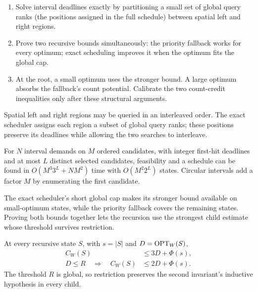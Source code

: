 \begin{proofstrategy}
\begin{enumerate}
\item Solve interval deadlines exactly by partitioning a small set
of global query ranks (the positions assigned in the full schedule)
between spatial left and right regions.
\item Prove two recursive bounds simultaneously: the priority fallback
works for every optimum; exact scheduling improves it when the optimum
fits the global cap.
\item At the root, a small optimum uses the stronger bound. A large
optimum absorbs the fallback's count potential. Calibrate the two
count-credit inequalities only after these structural arguments.
\end{enumerate}
\end{proofstrategy}

Spatial left and right regions may be queried in an interleaved order.
The exact scheduler assigns each region a subset of global query ranks;
these positions preserve its deadlines while allowing the two searches
to interleave.

\begin{proposition}
\label{lem:rank-subset-scheduling}
For $N$ interval demands on $M$ ordered candidates, with integer
first-hit deadlines and at most $L$ distinct selected candidates,
feasibility and a schedule can be found in
$O(M^3 3^L+NM^2)$ time with $O(M^2 2^L)$ states.
Circular intervals add a factor $M$ by enumerating the first candidate.
\end{proposition}

The exact scheduler's short global cap makes its stronger bound
available on small-optimum states, while the priority fallback covers
the remaining states. Proving both bounds together lets the recursion
use the strongest child estimate whose threshold survives restriction.

\begin{proposition}
\label{prop:slot-invariants}
At every recursive state $S$, with $s=|S|$ and $D=\operatorname{OPT}_W(S)$,
\begin{align}
 C_W(S)&\le3D+\Phi(s),\label{eq:slot-universal-invariant}\\
 D\le R\quad\Longrightarrow\quad
 C_W(S)&\le2D+\Phi(s).\label{eq:slot-restricted-invariant}
\end{align}
The threshold $R$ is global, so restriction preserves the second
invariant's inductive hypothesis in every child.
\end{proposition}

